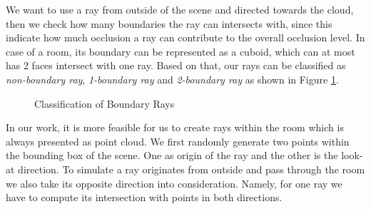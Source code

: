 \documentclass[11pt, a4paper,oneside,chapterprefix=false]{scrbook}
\begin{document}
We want to use a ray from outside of the scene and directed towards the cloud, then we check how many boundaries the ray can intersects with, since this indicate how much occlusion a ray can contribute to the overall occlusion level. In case of a room, its boundary can be represented as a cuboid, which can at most has 2 faces intersect with one ray. Based on that, our rays can be classified as \emph{non-boundary ray}, \emph{1-boundary ray} and \emph{2-boundary ray} as shown in Figure \ref{classification of bound ray}.

\begin{figure}[H]
    \centering
     \label{fig:non-bound ray}
     \label{fig:1-bound ray}
      \label{fig:2-bounds ray} 
    \caption{Classification of Boundary Rays}
    \label{classification of bound ray}
\end{figure}

\vspace{10pt}

In our work, it is more feasible for us to create rays within the room which is always presented as point cloud. We first randomly generate two points within the bounding box of the scene. One as origin of the ray and the other is the look-at direction. To simulate a ray originates from outside and pass through the room we also take its opposite direction into consideration. Namely, for one ray we have to compute its intersection with points in both directions. 
\end{document}
